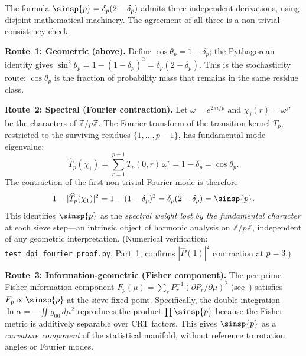 \documentclass[12pt,a4paper]{article}
\begin{document}
\begin{remark}
\label{rem:holonomy_routes}
The formula $\sinsp{p} = \delta_p(2 - \delta_p)$ admits three
independent derivations, using disjoint mathematical machinery.
The agreement of all three is a non-trivial consistency check.

\textbf{Route~1: Geometric (above).}
Define $\cos\theta_p = 1 - \delta_p$; the Pythagorean identity gives
$\sin^2\!\theta_p = 1 - (1-\delta_p)^2 = \delta_p(2-\delta_p)$.
This is the stochasticity route: $\cos\theta_p$ is the fraction of
probability mass that remains in the same residue class.

\textbf{Route~2: Spectral (Fourier contraction).}
Let $\omega = e^{2\pi i/p}$ and $\chi_j(r) = \omega^{jr}$ be the
characters of $\mathbb{Z}/p\mathbb{Z}$. The Fourier transform of
the transition kernel $T_p$, restricted to the surviving residues
$\{1, \ldots, p-1\}$, has fundamental-mode eigenvalue:
\begin{equation}
  \widehat{T}_p(\chi_1) = \sum_{r=1}^{p-1} T_p(0,r)\,\omega^r
  = 1 - \delta_p = \cos\theta_p.
  \label{eq:fourier_eigenvalue}
\end{equation}
The contraction of the first non-trivial Fourier mode is therefore
\begin{equation}
  1 - |\widehat{T}_p(\chi_1)|^2 = 1 - (1-\delta_p)^2
  = \delta_p(2-\delta_p) = \sinsp{p}.
  \label{eq:fourier_holonomy}
\end{equation}
This identifies $\sinsp{p}$ as the \emph{spectral weight lost by the
fundamental character} at each sieve step---an intrinsic object of
harmonic analysis on $\mathbb{Z}/p\mathbb{Z}$, independent of any
geometric interpretation. (Numerical verification:
\texttt{test\_dpi\_fourier\_proof.py}, Part~1, confirms $|\hat{P}(1)|^2$
contraction at $p = 3$.)

\textbf{Route~3: Information-geometric (Fisher component).}
The per-prime Fisher information component
$F_p(\mu) = \sum_r P_r^{-1}(\partial P_r/\partial\mu)^2$
(see~\cite{companion_M5}) satisfies
$F_p \propto \sinsp{p}$ at the sieve fixed point. Specifically, the
double integration $\ln\alpha = -\iint g_{00}\,d\mu^2$ reproduces the
product $\prod \sinsp{p}$ because the Fisher metric is additively
separable over CRT factors.
This gives $\sinsp{p}$ as a \emph{curvature component} of the
statistical manifold, without reference to rotation angles or
Fourier modes.


\end{remark}
\end{document}
